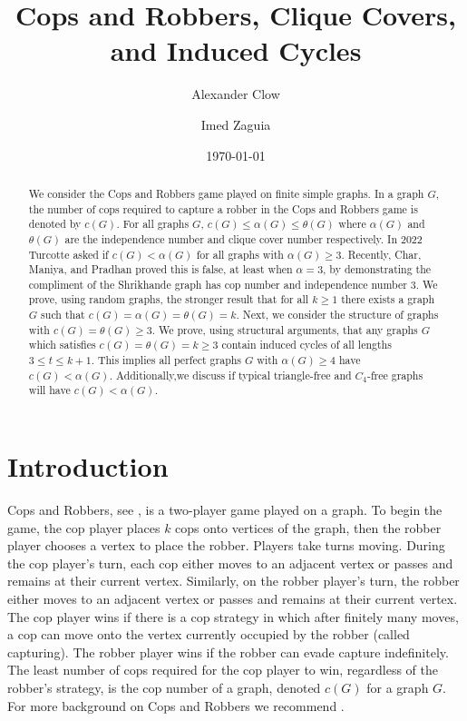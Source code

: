 \documentclass[12pt]{amsart}
\title{Cops and Robbers, Clique Covers, and Induced Cycles}
\author{Alexander Clow}
\author{Imed Zaguia}
\date{\today}
\theoremstyle{definition}
\begin{document}
\begin{abstract}
    We consider the Cops and Robbers game played on finite simple graphs.
    In a graph $G$, the number of cops required to capture a robber in the Cops and Robbers game is denoted by $c(G)$.
    For all graphs $G$, 
    $c(G) \leq \alpha(G) \leq \theta(G)$
    where $\alpha(G)$ and $\theta(G)$ are the independence number and clique cover number respectively.
    In 2022 Turcotte asked if $c(G) < \alpha(G)$ for all graphs with $\alpha(G) \geq 3$.
    Recently, Char, Maniya, and Pradhan proved this is false, at least when $\alpha = 3$,
    by demonstrating the compliment of the Shrikhande graph has cop number and independence number $3$.
    We prove, using random graphs, the stronger result that for all $k\geq 1$ there exists a graph $G$ such that $c(G) = \alpha(G) = \theta(G) = k$.
    Next, we consider the structure of graphs with $c(G) = \theta(G) \geq 3$.
    We prove, using structural arguments, that any graphs $G$ which satisfies $c(G) = \theta(G) = k \geq 3$
    contain induced cycles of all lengths $3\leq t \leq k+1$.
    This implies all perfect graphs $G$ with $\alpha(G)\geq 4$
    have $c(G) < \alpha(G)$.
    Additionally,we discuss if typical triangle-free and $C_4$-free
    graphs will have
    $c(G) < \alpha(G)$.
\end{abstract}

\maketitle

\section{Introduction}

Cops and Robbers, see \cite{AIGNER1984, nowakowski1983vertex,quilliot1983problemes}, is a two-player game played on a graph. 
To begin the game, the cop player places $k$ cops onto vertices of the graph,
then the robber player chooses a vertex to place the robber. 
Players take turns moving. 
During the cop player’s turn, each cop either moves to an adjacent vertex or passes and remains at their current vertex. 
Similarly, on the robber player’s turn, the robber either moves to an adjacent vertex or passes and remains at their current vertex.
The cop player wins if there is a cop strategy in which after finitely many moves, a cop can move onto the vertex currently occupied by the robber (called capturing).
The robber player wins if the robber can evade capture indefinitely. 
The least number of cops required for the cop player to win, regardless of the robber’s strategy, is the cop number of a graph, denoted $c(G)$ for a graph $G$.
For more background on Cops and Robbers we recommend \cite{bonato2011game}.
\end{document}
